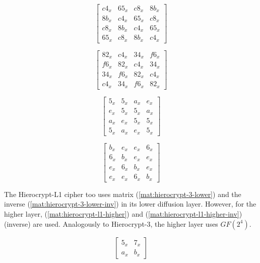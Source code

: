 \begin{equation}\label{mat:hierocrypt-3-lower}
\begin{bmatrix}
c4_x & 65_x & c8_x & 8b_x\\
8b_x & c4_x & 65_x & c8_x\\
c8_x & 8b_x & c4_x & 65_x\\
65_x & c8_x & 8b_x & c4_x
\end{bmatrix}
\end{equation}

\begin{equation}\label{mat:hierocrypt-3-lower-inv}
\begin{bmatrix}
82_x & c4_x & 34_x & f6_x\\
f6_x & 82_x & c4_x & 34_x\\
34_x & f6_x & 82_x & c4_x\\
c4_x & 34_x & f6_x & 82_x
\end{bmatrix}
\end{equation}

\begin{equation}\label{mat:hierocrypt-3-higher}
\begin{bmatrix}
5_x & 5_x & a_x & e_x\\
e_x & 5_x & 5_x & a_x\\
a_x & e_x & 5_x & 5_x\\
5_x & a_x & e_x & 5_x
\end{bmatrix}
\end{equation}

\begin{equation}\label{mat:hierocrypt-3-higher-inv}
\begin{bmatrix}
b_x & e_x & e_x & 6_x\\
6_x & b_x & e_x & e_x\\
e_x & 6_x & b_x & e_x\\
e_x & e_x & 6_x & b_x
\end{bmatrix}
\end{equation}

The Hierocrypt-L1 cipher too uses matrix (\ref{mat:hierocrypt-3-lower}) and the inverse (\ref{mat:hierocrypt-3-lower-inv}) in its lower diffusion layer. However, for the higher layer, (\ref{mat:hierocrypt-l1-higher}) and (\ref{mat:hierocrypt-l1-higher-inv}) (inverse) are used. Analogously to Hierocrypt-3, the higher layer uses $GF(2^4)$.

\begin{equation}\label{mat:hierocrypt-l1-higher}
\begin{bmatrix}
5_x & 7_x\\
a_x & b_x
\end{bmatrix}
\end{equation}

